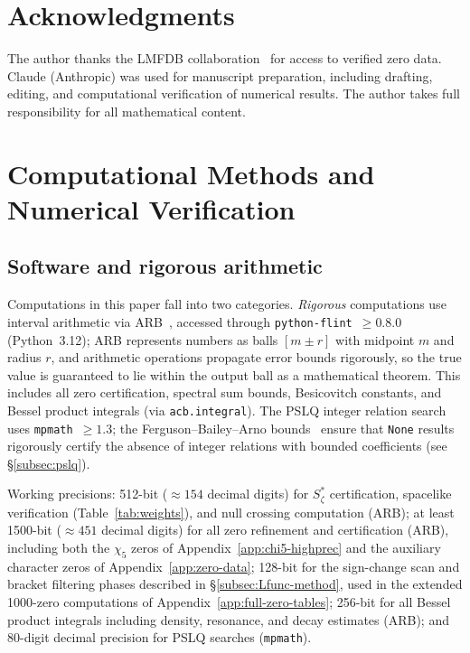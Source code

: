 \documentclass[12pt,reqno]{amsart}
\theoremstyle{plain}
\theoremstyle{definition}
\theoremstyle{remark}
\begin{document}
\section*{Acknowledgments}

The author thanks the LMFDB collaboration~\cite{LMFDB} for access to verified zero data.  Claude (Anthropic) was used for manuscript preparation, including drafting, editing, and computational verification of numerical results.  The author takes full responsibility for all mathematical content.
\appendix
{}
\section{Computational Methods and Numerical Verification}\label{sec:numerical}

\subsection{Software and rigorous arithmetic}\label{subsec:software}

Computations in this paper fall into two categories.  \emph{Rigorous} computations use interval arithmetic via ARB~\cite{Johansson2017}, accessed through \texttt{python-flint}~$\geq 0.8.0$ (Python~3.12); ARB represents numbers as balls $[m \pm r]$ with midpoint $m$ and radius $r$, and arithmetic operations propagate error bounds rigorously, so the true value is guaranteed to lie within the output ball as a mathematical theorem.  This includes all zero certification, spectral sum bounds, Besicovitch constants, and Bessel product integrals (via \texttt{acb.integral}).  The PSLQ integer relation search uses \texttt{mpmath}~$\geq 1.3$; the Ferguson--Bailey--Arno bounds~\cite{FBA1999} ensure that \texttt{None} results rigorously certify the absence of integer relations with bounded coefficients (see \S\ref{subsec:pslq}).

Working precisions: 512-bit ($\approx 154$ decimal digits) for $S_\zeta^*$ certification, spacelike verification (Table~\ref{tab:weights}), and null crossing computation (ARB); at least 1500-bit ($\approx 451$ decimal digits) for all zero refinement and certification (ARB), including both the $\chi_5$ zeros of Appendix~\ref{app:chi5-highprec} and the auxiliary character zeros of Appendix~\ref{app:zero-data}; 128-bit for the sign-change scan and bracket filtering phases described in \S\ref{subsec:Lfunc-method}, used in the extended 1000-zero computations of Appendix~\ref{app:full-zero-tables}; 256-bit for all Bessel product integrals including density, resonance, and decay estimates (ARB); and 80-digit decimal precision for PSLQ searches (\texttt{mpmath}).
\end{document}

